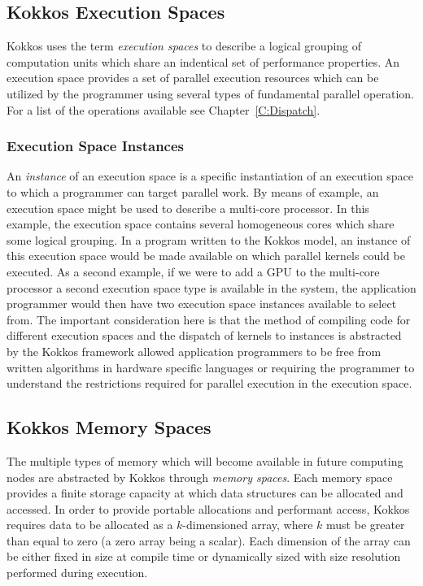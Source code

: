\subsection{Kokkos Execution Spaces}

Kokkos uses the term {\em execution spaces} to describe a logical
grouping of computation units which share an indentical set of
performance properties. An execution space provides a set of 
parallel execution resources which can be utilized by the
programmer using several types of fundamental parallel
operation. For a list of the operations available see
Chapter~\ref{C:Dispatch}.

\subsubsection{Execution Space Instances}

An {\em instance} of an execution space is a specific instantiation
of an execution space to which a programmer can target parallel
work. By means of example, an execution space might be used
to describe a multi-core processor. In this example, the
execution space contains several homogeneous cores which share
some logical grouping. In a program written to the Kokkos model,
an instance of this execution space would be made available
on which parallel kernels could be executed. As a second example,
if we were to add a GPU to the multi-core processor a second
execution space type is available in the system, the 
application programmer would then have two 
execution space instances available to select from. The
important consideration here is that the method of
compiling code for different execution spaces and the
dispatch of kernels to instances is abstracted by the Kokkos
framework allowed application programmers to be free from 
written algorithms in hardware specific languages or
requiring the programmer to understand the restrictions
required for parallel execution in the execution space.

\subsection{Kokkos Memory Spaces}

The multiple types of memory which will become available in future
computing nodes are abstracted by Kokkos through {\em memory
spaces}. Each memory space provides a finite storage capacity
at which data structures can be allocated and accessed. In
order to provide portable allocations and performant access,
Kokkos requires data to be allocated as a $k$-dimensioned array,
where $k$ must be greater than equal to zero (a zero array being
a scalar). Each dimension of the array can be either fixed in
size at compile time or dynamically sized with size resolution
performed during execution.

